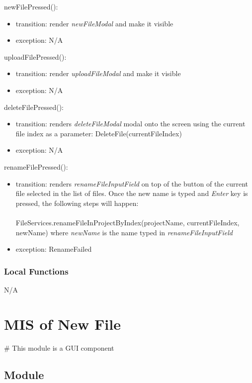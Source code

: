 \documentclass[12pt, titlepage]{article}
\begin{document}
	\noindent newFilePressed():
	\begin{itemize}
		\item transition: render \textit{newFileModal} and make it visible
		\item exception: N/A
	\end{itemize}
	
	\noindent uploadFilePressed():
	\begin{itemize}
		\item transition: render \textit{uploadFileModal} and make it visible
		\item exception: N/A
	\end{itemize}
	
	\noindent deleteFilePressed():
	\begin{itemize}
		\item transition: renders \textit{deleteFileModal} modal onto the screen using the current file index as a parameter: DeleteFile(currentFileIndex)
		\item exception: N/A
	\end{itemize}
	
	\noindent renameFilePressed():
	\begin{itemize}
		\item transition: renders \textit{renameFileInputField} on top of the button of the current file selected in the list of files. Once the new name is typed and \textit{Enter} key is pressed, the following steps will happen: \\\\
		FileServices.renameFileInProjectByIndex(projectName, currentFileIndex, newName) where \textit{newName} is the name typed in \textit{renameFileInputField}
		\item exception: RenameFailed
	\end{itemize}
	
	\subsubsection{Local Functions}
	N/A
	
	\newpage
	
	\section{MIS of New File} \label{Module} 
	\# This module is a GUI component
	\subsection{Module}
	
\end{document}

